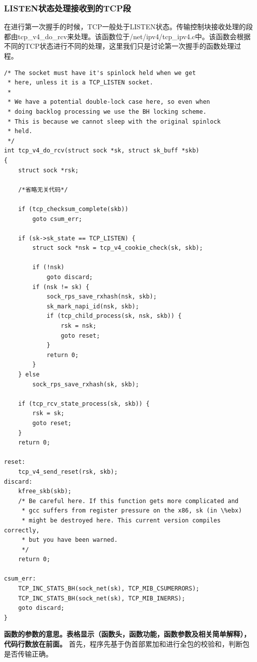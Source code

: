 \documentclass[11pt, a4paper,oneside]{book}
\theoremstyle{ocrenumbox}
\theoremstyle{purplenumbox}
\theoremstyle{blackbox}
\begin{document}
            \subsubsection{LISTEN状态处理接收到的TCP段}
                在进行第一次握手的时候，TCP一般处于LISTEN状态。传输控制块接收处理的段都由tcp\_v4\_do\_rcv来处理。该函数位于/net/ipv4/tcp\_ipv4.c中。该函数会根据不同的TCP状态进行不同的处理，这里我们只是讨论第一次握手的函数处理过程。
\begin{verbatim}
/* The socket must have it's spinlock held when we get
 * here, unless it is a TCP_LISTEN socket.
 *
 * We have a potential double-lock case here, so even when
 * doing backlog processing we use the BH locking scheme.
 * This is because we cannot sleep with the original spinlock
 * held.
 */
int tcp_v4_do_rcv(struct sock *sk, struct sk_buff *skb)
{
    struct sock *rsk;

    /*省略无关代码*/

    if (tcp_checksum_complete(skb))
        goto csum_err;

    if (sk->sk_state == TCP_LISTEN) {
        struct sock *nsk = tcp_v4_cookie_check(sk, skb);

        if (!nsk)
            goto discard;
        if (nsk != sk) {
            sock_rps_save_rxhash(nsk, skb);
            sk_mark_napi_id(nsk, skb);
            if (tcp_child_process(sk, nsk, skb)) {
                rsk = nsk;
                goto reset;
            }
            return 0;
        }
    } else
        sock_rps_save_rxhash(sk, skb);

    if (tcp_rcv_state_process(sk, skb)) {
        rsk = sk;
        goto reset;
    }
    return 0;

reset:
    tcp_v4_send_reset(rsk, skb);
discard:
    kfree_skb(skb);
    /* Be careful here. If this function gets more complicated and
     * gcc suffers from register pressure on the x86, sk (in \%ebx)
     * might be destroyed here. This current version compiles correctly,
     * but you have been warned.
     */
    return 0;

csum_err:
    TCP_INC_STATS_BH(sock_net(sk), TCP_MIB_CSUMERRORS);
    TCP_INC_STATS_BH(sock_net(sk), TCP_MIB_INERRS);
    goto discard;
}
\end{verbatim}

                \textbf{函数的参数的意思。表格显示（函数头，函数功能，函数参数及相关简单解释），代码行数放在前面。}
                首先，程序先基于伪首部累加和进行全包的校验和，判断包是否传输正确。
\end{document}

